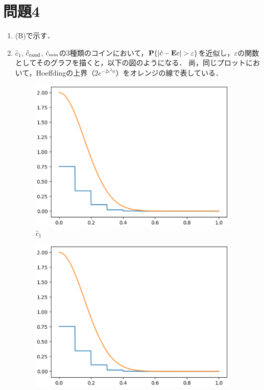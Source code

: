\section*{問題4}
\begin{enumerate}
    \renewcommand{\labelenumi}{\Alph{enumi}.}
    \item (B)で示す．
    \item
    $\hat{c}_1$, $\hat{c}_{\rm rand}$, $\hat{c}_{\rm min}$の3種類のコインにおいて，$\bm{{\rm P}}\{|\hat{c}-\bm{{\rm E}}c|>\varepsilon\}$を近似し，$\varepsilon$の関数としてそのグラフを描くと，以下の図のようになる．
    尚，同じプロットにおいて，Hoeffdingの上界（$2e^{-2\varepsilon^2n}$）をオレンジの線で表している．
    \begin{figure}[H]
        \begin{center}
            \includegraphics[width=100mm]{./figures/section_4/Hoeffding_c1.eps}
            \captionsetup{labelformat=empty,labelsep=none}
            \caption{$\hat{c}_1$}
        \end{center}
    \end{figure}
    \begin{figure}[H]
        \begin{center}
            \includegraphics[width=100mm]{./figures/section_4/Hoeffding_crand.eps}

\end{center}
\end{figure}
\end{enumerate}
